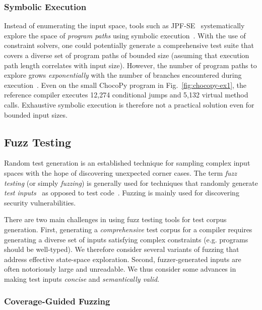 \documentclass[conference]{IEEEtran}
\begin{document}
\subsubsection{Symbolic Execution}

Instead of enumerating the input space, tools such as JPF-SE~\cite{Anand07} systematically explore the space of \emph{program paths} using symbolic execution~\cite{King76}. With the use of constraint solvers, one could potentially generate a comprehensive test suite that covers a diverse set of program paths of bounded size (assuming that execution path length correlates with input size).
However, the number of program paths to explore grows \emph{exponentially} with the number of branches encountered during execution~\cite{Cadar13}. Even on the small ChocoPy program in Fig.~\ref{fig:chocopy-ex1}, the reference compiler executes {12,274 conditional jumps} and {5,132 virtual method calls}. Exhaustive symbolic execution is therefore not a practical solution even for bounded input sizes.

\subsection{Fuzz Testing}

Random test generation is an established technique for sampling complex input spaces with the hope of discovering unexpected corner cases. The term \emph{fuzz testing} (or simply \emph{fuzzing}) is generally used for techniques that randomly generate \emph{test inputs}~\cite{Miller90, Godefroid20} as opposed to test code~\cite{Pacheco07, Fraser10, Fraser12}. Fuzzing is mainly used for discovering security vulnerabilities.

There are two main challenges in using fuzz testing tools for test corpus generation. First, generating a \emph{comprehensive} test corpus for a compiler requires generating a diverse set of inputs satisfying complex constraints (e.g. programs should be well-typed). We therefore consider several variants of fuzzing that address effective state-space exploration. Second, fuzzer-generated inputs are often notoriously large and unreadable. We thus consider some advances in making test inputs \emph{concise} and \emph{semantically valid}.

\subsubsection{Coverage-Guided Fuzzing}
\end{document}
